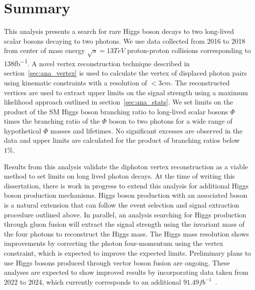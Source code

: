 \section{Summary} \label{sec:ana_conclusion}
This analysis presents a search for rare Higgs boson decays to two long-lived scalar bosons decaying to two photons. We use data collected from 2016 to 2018 from center of mass energy $\sqrt{s}=13\unit{TeV}$ proton-proton collisions corresponding to 138\unit{fb^{-1}}. A novel vertex reconstruction technique described in section~\ref{sec:ana_vertex} is used to calculate the vertex of displaced photon pairs using kinematic constraints with a resolution of $<3\unit{cm}$. The reconstructed vertices are used to extract upper limits on the signal strength using a maximum likelihood approach outlined in section~\ref{sec:ana_stats}. We set limits on the product of the SM Higgs boson branching ratio to long-lived scalar bosons $\Phi$ times the branching ratio of the $\Phi$ boson to two photons for a wide range of hypothetical $\Phi$ masses and lifetimes. No significant excesses are observed in the data and upper limits are calculated for the product of branching ratios below $1\%$.

Results from this analysis validate the diphoton vertex reconstruction as a viable method to set limits on long lived photon decays. At the time of writing this dissertation, there is work in progress to extend this analysis for additional Higgs boson production mechanisms. Higgs boson production with an associated \VW boson is a natural extension that can follow the event selection and signal extraction procedure outlined above. In parallel, an analysis searching for Higgs production through gluon fusion will extract the signal strength using the invariant mass of the four photons to reconstruct the Higgs mass. The Higgs mass resolution shows improvements by correcting the photon four-momentum using the vertex constraint, which is expected to improve the expected limits. Preliminary plans to use Higgs bosons produced through vector boson fusion are ongoing. These analyses are expected to show improved results by incorporating data taken from 2022 to 2024, which currently corresponds to an additional $91.49\unit{fb^{-1}}$~\cite{CMSlumi}.